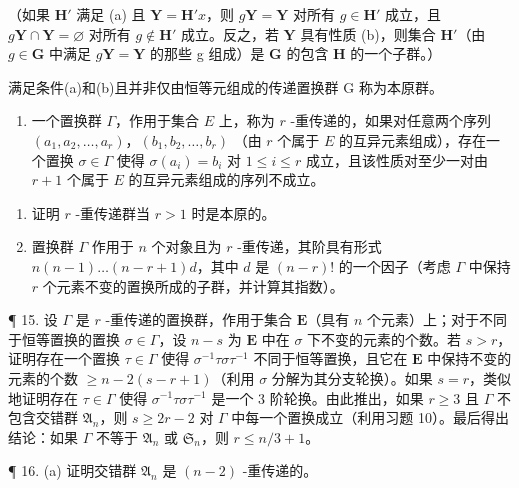（如果 \(\mathbf{H}'\) 满足 (a) 且 \(\mathbf{Y} = \mathbf{H}'x\)，则 \(g\mathbf{Y} = \mathbf{Y}\) 对所有 \(g \in \mathbf{H}'\) 成立，且 \(g\mathbf{Y} \cap \mathbf{Y} = \varnothing\) 对所有 \(g \notin \mathbf{H}'\) 成立。反之，若 \(\mathbf{Y}\) 具有性质 (b)，则集合 \(\mathbf{H}'\)（由 \(g \in \mathbf{G}\) 中满足 \(g\mathbf{Y} = \mathbf{Y}\) 的那些 g 组成）是 \(\mathbf{G}\) 的包含 \(\mathbf{H}\) 的一个子群。）

满足条件(a)和(b)且并非仅由恒等元组成的传递置换群 G 称为本原群。

\begin{enumerate}
\def\labelenumi{\arabic{enumi}。}
\setcounter{enumi}{13}
\tightlist
\item
  一个置换群 \(\Gamma\)，作用于集合 \(E\) 上，称为 \(r\) -重传递的，如果对任意两个序列 \((a_1, a_2, \ldots, a_r)\)，\((b_1, b_2, \ldots, b_r)\) （由 \(r\) 个属于 \(E\) 的互异元素组成），存在一个置换 \(\sigma \in \Gamma\) 使得 \(\sigma(a_i) = b_i\) 对 \(1 \leqslant i \leqslant r\) 成立，且该性质对至少一对由 \(r + 1\) 个属于 \(E\) 的互异元素组成的序列不成立。
\end{enumerate}

\begin{enumerate}
\def\labelenumi{(\alph{enumi})}
\item
  证明 \(r\) -重传递群当 \(r > 1\) 时是本原的。
\item
  置换群 \(\Gamma\) 作用于 \(n\) 个对象且为 \(r\) -重传递，其阶具有形式 \(n(n - 1)\ldots (n - r + 1)d\)，其中 \(d\) 是 \((n - r)!\) 的一个因子（考虑 \(\Gamma\) 中保持 \(r\) 个元素不变的置换所成的子群，并计算其指数）。
\end{enumerate}

¶ 15. 设 \(\Gamma\) 是 \(r\) -重传递的置换群，作用于集合 \(\mathbf{E}\)（具有 \(n\) 个元素）上；对于不同于恒等置换的置换 \(\sigma \in \Gamma\)，设 \(n - s\) 为 \(\mathbf{E}\) 中在 \(\sigma\) 下不变的元素的个数。若 \(s > r\)，证明存在一个置换 \(\tau \in \Gamma\) 使得 \(\sigma^{-1}\tau \sigma \tau^{-1}\) 不同于恒等置换，且它在 \(\mathbf{E}\) 中保持不变的元素的个数 \(\geqslant n - 2(s - r + 1)\)（利用 \(\sigma\) 分解为其分支轮换）。如果 \(s = r\)，类似地证明存在 \(\tau \in \Gamma\) 使得 \(\sigma^{-1}\tau \sigma \tau^{-1}\) 是一个 3 阶轮换。由此推出，如果 \(r \geqslant 3\) 且 \(\Gamma\) 不包含交错群 \(\mathfrak{A}_n\)，则 \(s \geqslant 2r - 2\) 对 \(\Gamma\) 中每一个置换成立（利用习题 10）。最后得出结论：如果 \(\Gamma\) 不等于 \(\mathfrak{A}_n\) 或 \(\mathfrak{S}_n\)，则 \(r \leqslant n/3 + 1\)。

¶ 16. (a) 证明交错群 \(\mathfrak{A}_n\) 是 \((n - 2)\) -重传递的。

